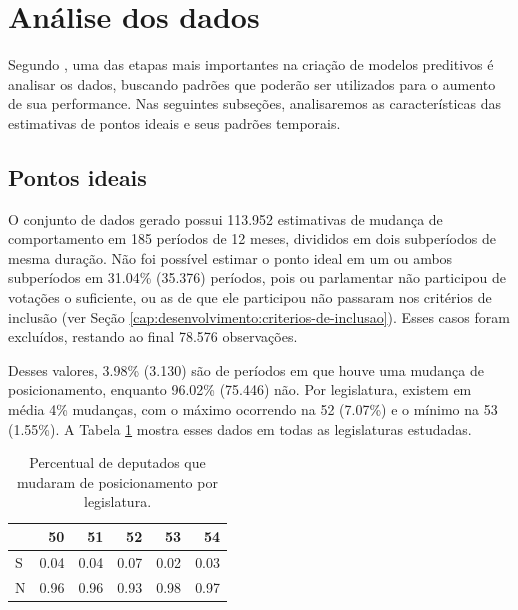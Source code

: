 \documentclass[a4paper,titlepage]{ppgi}\usepackage[]{graphicx}\usepackage[]{color}
\newenvironment{knitrout}{}{} %
\begin{document}
\section{Análise dos dados}
\label{cap:desenvolvimento:analise}

Segundo , uma das etapas mais importantes na criação de
modelos preditivos é analisar os dados, buscando padrões que poderão ser
utilizados para o aumento de sua performance. Nas seguintes subseções,
analisaremos as características das estimativas de pontos ideais e seus padrões
temporais.

\subsection{Pontos ideais}



O conjunto de dados gerado possui 113.952 estimativas de mudança
de comportamento em 185 períodos de 12 meses, divididos em dois
subperíodos de mesma duração. Não foi possível estimar o ponto ideal em um ou
ambos subperíodos em 31.04\%
(35.376) períodos, pois ou parlamentar não participou de
votações o suficiente, ou as de que ele participou não passaram nos critérios de
inclusão (ver Seção \ref{cap:desenvolvimento:criterios-de-inclusao}). Esses
casos foram excluídos, restando ao final 78.576 observações.

Desses valores, 3.98\%
(3.130) são de períodos em que houve uma mudança de
posicionamento, enquanto 96.02\% (75.446) não. Por legislatura, existem em
média 4\%
mudanças, com o máximo ocorrendo na 52\textordfeminine{}
(7.07\%) e o
mínimo na 53\textordfeminine{}
(1.55\%).  A
Tabela \ref{table:coalition-changes-per-legislature} mostra esses dados em
todas as legislaturas estudadas.

\begin{table}
\caption{Percentual de deputados que mudaram de posicionamento por legislatura.}
\label{table:coalition-changes-per-legislature}
\centering
\begin{knitrout}
\color{fgcolor}
\begin{tabular}{l|r|r|r|r|r}
\hline
  & 50 & 51 & 52 & 53 & 54\\
\hline
S & 0.04 & 0.04 & 0.07 & 0.02 & 0.03\\
\hline
N & 0.96 & 0.96 & 0.93 & 0.98 & 0.97\\
\hline
\end{tabular}


\end{knitrout}
\end{table}
\end{document}
